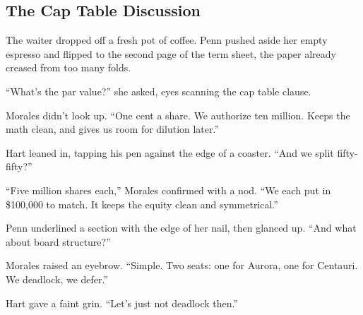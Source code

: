 \medskip

\subsection{The Cap Table Discussion}

The waiter dropped off a fresh pot of coffee. Penn pushed aside her empty espresso and flipped to the second page of the 
term sheet, the paper already creased from too many folds.

``What’s the par value?'' she asked, eyes scanning the cap table clause.

Morales didn’t look up. ``One cent a share. We authorize ten million. Keeps the math clean, and gives us room for 
dilution later.''

Hart leaned in, tapping his pen against the edge of a coaster. ``And we split fifty-fifty?''

``Five million shares each,'' Morales confirmed with a nod. ``We each put in \$100,000 to match. It keeps the equity 
clean and symmetrical.''

Penn underlined a section with the edge of her nail, then glanced up. ``And what about board structure?''

Morales raised an eyebrow. ``Simple. Two seats: one for Aurora, one for Centauri. We deadlock, we defer.''

Hart gave a faint grin. ``Let’s just not deadlock then.''

